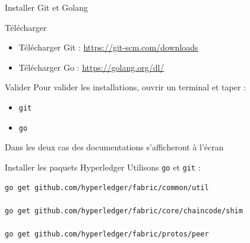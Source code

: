 \documentclass[presentation]{beamer}
\begin{document}
\begin{frame}[fragile,label={sec:org2f34247}]{Installer Git et Golang}
 \begin{block}{Télécharger}
\begin{itemize}
\item Télécharger Git : \url{https://git-scm.com/downloads}
\item Télécharger Go : \url{https://golang.org/dl/}
\end{itemize}
\end{block}
\begin{block}{Valider}
Pour valider les installations, ouvrir un terminal et taper :
\begin{itemize}
\item \texttt{git}
\item \texttt{go}
\end{itemize}

Dans les deux cas des documentations s'afficheront à l'écran
\end{block}
\end{frame}
\begin{frame}[fragile,label={sec:org1a08414}]{Installer les paquets Hyperledger}
 Utilisons \texttt{go} et \texttt{git} :

\begin{verbatim}
go get github.com/hyperledger/fabric/common/util

go get github.com/hyperledger/fabric/core/chaincode/shim

go get github.com/hyperledger/fabric/protos/peer
\end{verbatim}
\end{frame}
\end{document}
